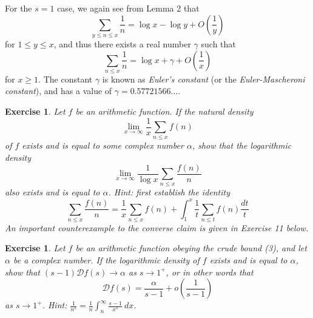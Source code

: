 \documentclass[10pt,reqno]{amsart}
\newtheorem{exercise}[theorem]{Exercise}
\begin{document}
For the $s=1$ case, we again see from Lemma 2 that
%
\[ \sum_{y \leq n \leq x} \frac{1}{n} = \log x - \log y + O \left( \frac{1}{y} \right) \]
%
for $1 \leq y \leq x$, and thus there exists a real number $\gamma$ such that
%
\begin{equation} \sum_{n \leq x} \frac{1}{n} = \log x + \gamma + O \left( \frac{1}{x} \right) \end{equation}
%
for $x \geq 1$. The constant $\gamma$ is known as \emph{Euler’s constant} (or the \emph{Euler-Mascheroni constant}), and has a value of $\gamma = 0.57721566\dots$.

\begin{exercise}
    Let $f$ be an arithmetic function. If the natural density
    \[ \lim_{x \rightarrow \infty} \frac{1}{x} \sum_{n \leq x} f(n) \]
    of $f$ exists and is equal to some complex number $\alpha$, show that the logarithmic density
    \[ \lim_{x \rightarrow \infty} \frac{1}{\log x} \sum_{n \leq x} \frac{f(n)}{n} \]
    also exists and is equal to $\alpha$. Hint: first establish the identity
    \[ \sum_{n \leq x} \frac{f(n)}{n} = \frac{1}{x} \sum_{n \leq x} f(n) + \int_1^x \frac{1}{t} \sum_{n \leq t} f(n) \frac{dt}{t} \]
    An important counterexample to the converse claim is given in Exercise 11 below.
\end{exercise}

\begin{exercise}
    Let $f$ be an arithmetic function obeying the crude bound (3), and let $\alpha$ be a complex number. If the logarithmic density of $f$ exists and is equal to $\alpha$, show that $(s-1) {\mathcal D} f(s) \rightarrow \alpha$ as $s \rightarrow 1^+$, or in other words that
    \[ {\mathcal D} f(s) = \frac{\alpha}{s-1} + o \left( \frac{1}{s-1} \right) \]
    as $s \rightarrow 1^+$. Hint: $\frac{1}{n^s} = \frac{1}{n} \int_n^\infty \frac{s-1}{x^{s}}\ dx$.
\end{exercise}
\end{document}
